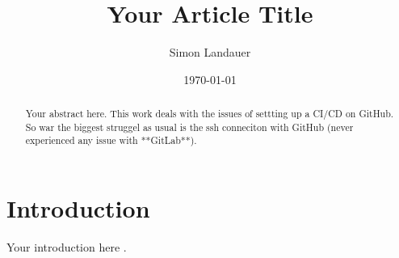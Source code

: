 \documentclass{article}
\title{Your Article Title}
\author{Simon Landauer}
\date{\today}
\begin{document}
\maketitle

\begin{abstract}
Your abstract here.
This work deals with the issues of settting up a CI/CD on GitHub. 
So war the biggest struggel as usual is the ssh conneciton with GitHub (never experienced any issue with **GitLab**).
\end{abstract}

\section{Introduction}
Your introduction here \cite{example}.



\end{document}
